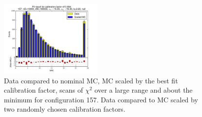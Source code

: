 \begin{figure}[htbp]
\begin{center}
\includegraphics[width=0.45\textwidth]{../FIGURES/157/FIG_Fit_result_for_calibration_factor_of_0_894.pdf} 
\caption{Data compared to nominal MC, MC scaled by the best fit calibration factor, scans of $\chi^2$ over a large range and about the minimum for configuration 157. Data compared to MC scaled by two randomly chosen calibration factors.} 
\label{tab:best_157} 
\end{center} \end{figure} 

